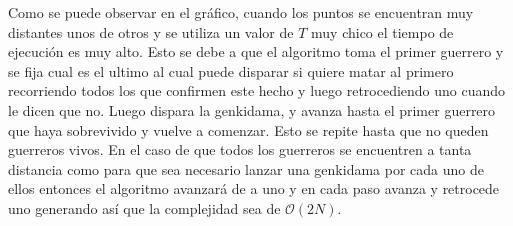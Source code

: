			Como se puede observar en el gráfico, cuando los puntos se encuentran muy distantes unos de otros y se utiliza un valor de $T$ muy chico el tiempo de ejecución es muy alto. 
			Esto se debe a que el algoritmo toma el primer guerrero y se fija cual es el ultimo al cual puede disparar si quiere matar al primero recorriendo todos los que confirmen este hecho y luego retrocediendo uno cuando le dicen que no. Luego dispara la genkidama, y avanza hasta el primer guerrero que haya sobrevivido y vuelve a comenzar. Esto se repite hasta que no queden guerreros vivos. En el caso de que todos los guerreros se encuentren a tanta distancia como para que sea necesario lanzar una genkidama por cada uno de ellos entonces el algoritmo avanzará de a uno y en cada paso avanza y retrocede uno generando así que la complejidad sea de $\mathcal{O}(2N)$. 

